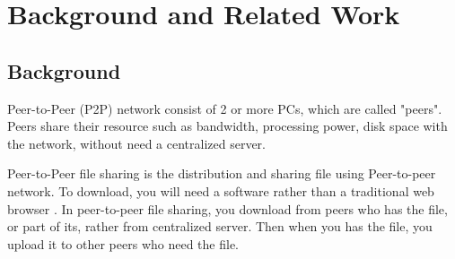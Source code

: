 \documentclass[conference]{IEEEtran}
\begin{document}
%




\section{Background and Related Work} \label{background}
\subsection{Background}
Peer-to-Peer (P2P) network consist of 2 or more PCs, which are called "peers". Peers share their resource such as bandwidth, processing power, disk space with the network, without need a centralized server. \cite{schollmeier2001definition}

Peer-to-Peer file sharing is the distribution and sharing file using Peer-to-peer network. To download, you will need a software rather than a traditional web browser \cite{HowBitTorrentWorks}. In peer-to-peer file sharing, you download from peers who has the file, or part of its, rather from centralized server. Then when you has the file, you upload it to other peers who need the file. \cite{HowP2PWorks}
\end{document}
